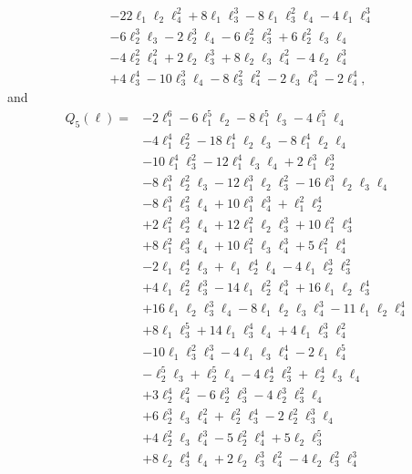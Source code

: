 \begin{proposition}
\[\begin{aligned}
\\
&- 22\ell_1\ell_2\ell_4^2 + 8\ell_1\ell_3^3
- 8\ell_1\ell_3^2\ell_4 - 4\ell_1\ell_4^3
\\
&- 6\ell_2^3\ell_3 - 2\ell_2^3\ell_4
- 6\ell_2^2\ell_3^2 + 6\ell_2^2\ell_3\ell_4
\\
&- 4\ell_2^2\ell_4^2 + 2\ell_2\ell_3^3
+ 8\ell_2\ell_3\ell_4^2 - 4\ell_2\ell_4^3
\\
&+ 4\ell_3^4 - 10\ell_3^3\ell_4
- 8\ell_3^2\ell_4^2 - 2\ell_3\ell_4^3
- 2\ell_4^4,
\end{aligned}
\]
and
\[
\begin{aligned}
Q_5(\ell)={}&
-2\ell_1^6 - 6\ell_1^5\ell_2 - 8\ell_1^5\ell_3
- 4\ell_1^5\ell_4
\\
&- 4\ell_1^4\ell_2^2 - 18\ell_1^4\ell_2\ell_3
- 8\ell_1^4\ell_2\ell_4
\\
&- 10\ell_1^4\ell_3^2 - 12\ell_1^4\ell_3\ell_4
+ 2\ell_1^3\ell_2^3
\\
&- 8\ell_1^3\ell_2^2\ell_3
- 12\ell_1^3\ell_2\ell_3^2
- 16\ell_1^3\ell_2\ell_3\ell_4
\\
&- 8\ell_1^3\ell_3^2\ell_4 + 10\ell_1^3\ell_4^3
+ \ell_1^2\ell_2^4
\\
&+ 2\ell_1^2\ell_2^3\ell_4
+ 12\ell_1^2\ell_2\ell_3^3
+ 10\ell_1^2\ell_3^4
\\
&+ 8\ell_1^2\ell_3^3\ell_4
+ 10\ell_1^2\ell_3\ell_4^3
+ 5\ell_1^2\ell_4^4
\\
&- 2\ell_1\ell_2^4\ell_3 + \ell_1\ell_2^4\ell_4
- 4\ell_1\ell_2^3\ell_3^2
\\
&+ 4\ell_1\ell_2^2\ell_3^3
- 14\ell_1\ell_2^2\ell_4^3
+ 16\ell_1\ell_2\ell_3^4
\\
&+ 16\ell_1\ell_2\ell_3^3\ell_4
- 8\ell_1\ell_2\ell_3\ell_4^3
- 11\ell_1\ell_2\ell_4^4
\\
&+ 8\ell_1\ell_3^5 + 14\ell_1\ell_3^4\ell_4
+ 4\ell_1\ell_3^3\ell_4^2
\\
&- 10\ell_1\ell_3^2\ell_4^3
- 4\ell_1\ell_3\ell_4^4 - 2\ell_1\ell_4^5
\\
&- \ell_2^5\ell_3 + \ell_2^5\ell_4
- 4\ell_2^4\ell_3^2 + \ell_2^4\ell_3\ell_4
\\
&+ 3\ell_2^4\ell_4^2 - 6\ell_2^3\ell_3^3
- 4\ell_2^3\ell_3^2\ell_4
\\
&+ 6\ell_2^3\ell_3\ell_4^2 + \ell_2^2\ell_3^4
- 2\ell_2^2\ell_3^3\ell_4
\\
&+ 4\ell_2^2\ell_3\ell_4^3 - 5\ell_2^2\ell_4^4
+ 5\ell_2\ell_3^5
\\
&+ 8\ell_2\ell_3^4\ell_4 + 2\ell_2\ell_3^3\ell_4^2
- 4\ell_2\ell_3^2\ell_4^3
\\

\end{aligned}\]
\end{proposition}
